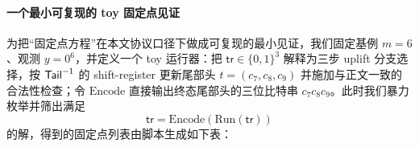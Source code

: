 \paragraph{一个最小可复现的 toy 固定点见证}
为把“固定点方程”在本文协议口径下做成可复现的最小见证，我们固定基例 \(m=6\)、观测 \(y=0^6\)，并定义一个 toy 运行器：把 \(\mathsf{tr}\in\{0,1\}^3\) 解释为三步 uplift 分支选择，按 \(\mathsf{Tail}^{-1}\) 的 shift-register 更新尾部头 \(t=(c_7,c_8,c_9)\) 并施加与正文一致的合法性检查；令 \(\mathrm{Encode}\) 直接输出终态尾部头的三位比特串 \(c_7c_8c_9\)。此时我们暴力枚举并筛出满足
$$
\mathsf{tr}=\mathrm{Encode}(\mathrm{Run}(\mathsf{tr}))
$$
的解，得到的固定点列表由脚本生成如下表：
\begin{center}
\small
\setlength{\tabcolsep}{8pt}

\end{center}

